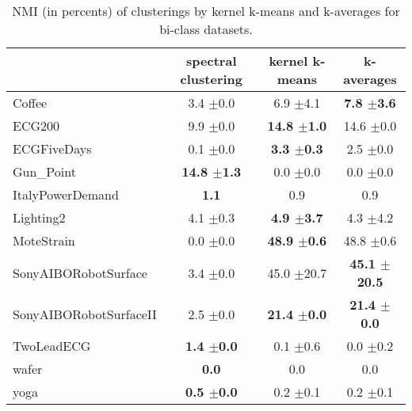 \documentclass[10pt,letterpaper]{article}
\begin{document}
\begin{table}[ht]
\begin{center}
\caption{NMI (in percents) of clusterings by kernel k-means and k-averages for bi-class datasets.}
\label{tab:results-2}
\begin{tabular}{lccc}
 & spectral clustering & kernel k-means & k-averages \\
\hline
Coffee & 3.4 $\pm$0.0 & 6.9 $\pm$4.1 & \textbf{7.8 $\pm$3.6} \\
ECG200 &  9.9 $\pm$0.0 & \textbf{14.8 $\pm$1.0} & 14.6 $\pm$0.0 \\
ECGFiveDays & 0.1 $\pm$0.0 & \textbf{3.3 $\pm$0.3} & 2.5 $\pm$0.0 \\
Gun\_Point & \textbf{14.8 $\pm$1.3} &  0.0 $\pm$0.0 &  0.0 $\pm$0.0 \\
ItalyPowerDemand & \textbf{1.1} & 0.9 & 0.9 \\
Lighting2 & 4.1 $\pm$0.3 & \textbf{4.9 $\pm$3.7} & 4.3 $\pm$4.2 \\
MoteStrain &  0.0 $\pm$0.0 & \textbf{48.9 $\pm$0.6} & 48.8 $\pm$0.6 \\
SonyAIBORobotSurface &   3.4 $\pm$0.0 & 45.0 $\pm$20.7 & \textbf{45.1 $\pm$20.5} \\
SonyAIBORobotSurfaceII &  2.5 $\pm$0.0 & \textbf{21.4 $\pm$0.0} & \textbf{21.4 $\pm$0.0} \\
TwoLeadECG & \textbf{1.4 $\pm$0.0} & 0.1 $\pm$0.6 & 0.0 $\pm$0.2 \\
wafer & \textbf{0.0} & 0.0 & 0.0 \\
yoga & \textbf{0.5 $\pm$0.0} & 0.2 $\pm$0.1 & 0.2 $\pm$0.1 \\
\end{tabular}
\end{center}
\end{table}
\end{document}
